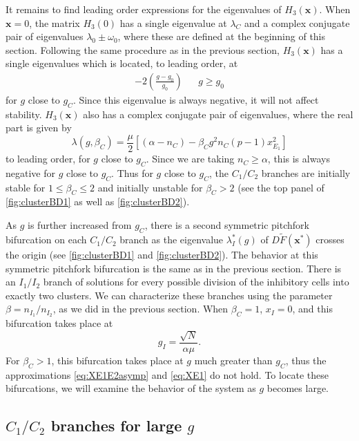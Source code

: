 \documentclass[reqno]{siamonline190516}
\newcommand{\xvec}{\mathbf{x}}
\begin{document}
It remains to find leading order expressions for the eigenvalues of $H_3(\xvec)$. When $\xvec = 0$, the matrix $H_3(0)$ has a single eigenvalue at $\lambda_C$ and a complex conjugate pair of eigenvalues $\lambda_0 \pm \omega_0$, where these are defined at the beginning of this section. Following the same procedure as in the previous section, $H_3(\xvec)$ has a single eigenvalues which is located, to leading order, at 
\begin{align*}
    -2\left( \frac{g - g_0}{g_0} \right)  && g \geq g_0
\end{align*}
for $g$ close to $g_C$. Since this eigenvalue is always negative, it will not affect stability. $H_3(\xvec)$ also has a complex conjugate pair of eigenvalues, where the real part is given by
\begin{equation*}
\lambda(g, \beta_C) = \frac{\mu}{2}\left[ (\alpha - n_C) - \beta_C g^2 n_C (p - 1) x_{E_1}^2 \right]
\end{equation*}
to leading order, for $g$ close to $g_C$. Since we are taking $n_C \geq \alpha$, this is always negative for $g$ close to $g_C$. Thus for $g$ close to $g_C$, the $C_1/C_2$ branches are initially stable for $1 \leq \beta_C \leq 2$ and initially unstable for $\beta_C > 2$ (see the top panel of \cref{fig:clusterBD1} as well as \cref{fig:clusterBD2}).

As $g$ is further increased from $g_C$, there is a second symmetric pitchfork bifurcation on each $C_1/C_2$ branch as the eigenvalue $\lambda_I^*(g)$ of $D\tilde{F}(\xvec^*)$ crosses the origin (see \cref{fig:clusterBD1} and \cref{fig:clusterBD2}). The behavior at this symmetric pitchfork bifurcation is the same as in the previous section. There is an $I_1/I_2$ branch of solutions for every possible division of the inhibitory cells into exactly two clusters. We can characterize these branches using the parameter $\beta = n_{I_1}/n_{I_2}$, as we did in the previous section. When $\beta_C = 1$, $x_I = 0$, and this bifurcation takes place at 
\begin{equation}\label{eq:gpitchinhbeta1}
g_I = \frac{\sqrt{N}}{\alpha \mu}.
\end{equation}
For $\beta_C > 1$, this bifurcation takes place at $g$ much greater than $g_C$, thus the approximations \cref{eq:XE1E2asymp} and \cref{eq:XE1} do not hold. To locate these bifurcations, we will examine the behavior of the system as $g$ becomes large.

\subsection{\texorpdfstring{$C_1/C_2$}{C1/C2} branches for large \texorpdfstring{$g$}{g}}
\end{document}
